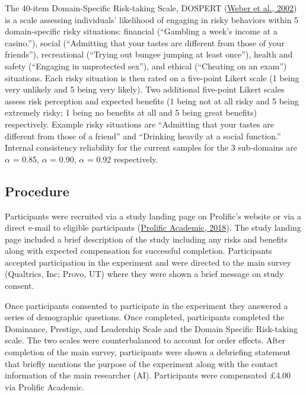 \documentclass[
  donotrepeattitle,doc, 12pt, a4paper,floatsintext]{apa7}
\begin{document}
The 40-item Domain-Specific Risk-taking Scale, DOSPERT (\protect\hyperlink{ref-weber2002}{Weber et al., 2002}) is a scale assessing individuals' likelihood of engaging in risky behaviors within 5 domain-specific risky situations: financial (``Gambling a week's income at a casino.''), social (``Admitting that your tastes are different from those of your friends''), recreational (``Trying out bungee jumping at least once''), health and safety (``Engaging in unprotected sex''), and ethical (``Cheating on an exam'') situations. Each risky situation is then rated on a five-point Likert scale (1 being very unlikely and 5 being very likely). Two additional five-point Likert scales assess risk perception and expected benefits (1 being not at all risky and 5 being extremely risky; 1 being no benefits at all and 5 being great benefits) respectively. Example risky situations are ``Admitting that your tastes are different from those of a friend'' and ``Drinking heavily at a social function.'' Internal consistency reliability for the current samples for the 3 sub-domains are \(\alpha\) = 0.85, \(\alpha\) = 0.90, \(\alpha\) = 0.92 respectively.

\hypertarget{procedure-3}{%
\subsection{Procedure}\label{procedure-3}}

Participants were recruited via a study landing page on Prolific's website or via a direct e-mail to eligible participants (\protect\hyperlink{ref-prolificacademic2018}{Prolific Academic, 2018}). The study landing page included a brief description of the study including any risks and benefits along with expected compensation for successful completion. Participants accepted participation in the experiment and were directed to the main survey (Qualtrics, Inc; Provo, UT) where they were shown a brief message on study consent.

Once participants consented to participate in the experiment they answered a series of demographic questions. Once completed, participants completed the Dominance, Prestige, and Leadership Scale and the Domain Specific Risk-taking scale. The two scales were counterbalanced to account for order effects. After completion of the main survey, participants were shown a debriefing statement that briefly mentions the purpose of the experiment along with the contact information of the main researcher (AI). Participants were compensated £4.00 via Prolific Academic.
\end{document}
